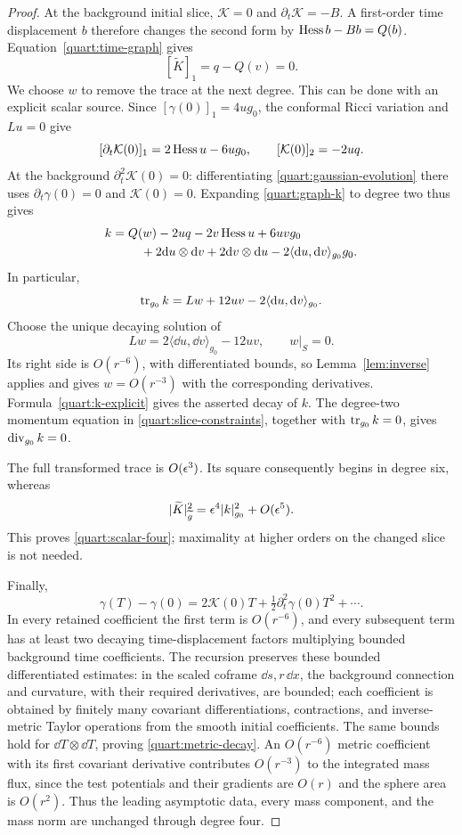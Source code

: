 \begin{proof}
At the background initial slice, \(\mathcal K=0\) and
\(\partial_t\mathcal K=-B\).  A first-order time displacement \(b\)
therefore changes the second form by
\(\operatorname{Hess} b-Bb=Q(b)\).  Equation~\eqref{quart:time-graph} gives
\[
 [\widetilde K]_1=q-Q(v)=0.
\]
We choose \(w\) to remove the trace at the next degree.  This can be
done with an explicit scalar source.  Since
\([\gamma(0)]_1=4ug_0\), the conformal Ricci variation and \(Lu=0\)
give
\[
 [\partial_t\mathcal K(0)]_1
   =2\operatorname{Hess} u-6ug_0,
 \qquad [\mathcal K(0)]_2=-2uq.
\]
At the background \(\partial_t^2\mathcal K(0)=0\): differentiating
\eqref{quart:gaussian-evolution} there uses
\(\partial_t\gamma(0)=0\) and \(\mathcal K(0)=0\).
Expanding \eqref{quart:graph-k} to degree two thus gives
\begin{align}
 k={}&Q(w)-2uq-2v\operatorname{Hess} u+6uvg_0\nonumber\\
     &\quad+2\mathrm{d} u\otimes\mathrm{d} v+2\mathrm{d} v\otimes\mathrm{d} u
          -2\langle\mathrm{d} u,\mathrm{d} v\rangle_{g_0}g_0.
 \label{quart:k-explicit}
\end{align}
In particular,
\[
 \operatorname{tr}_{g_0}k=Lw+12uv-2\langle\mathrm{d} u,\mathrm{d} v\rangle_{g_0}.
\]
Choose the unique decaying solution of
\begin{equation}
 Lw=2\langle\dd u,\dd v\rangle_{g_0}-12uv,
 \qquad w|_S=0.
 \label{quart:w-equation}
\end{equation}
Its right side is \(O(r^{-6})\), with differentiated bounds, so
Lemma~\ref{lem:inverse} applies and gives \(w=O(r^{-3})\) with the
corresponding derivatives.  Formula~\eqref{quart:k-explicit} gives the
asserted decay of \(k\).  The degree-two momentum equation in
\eqref{quart:slice-constraints}, together with \(\operatorname{tr}_{g_0}k=0\),
gives \(\operatorname{div}_{g_0}k=0\).

The full transformed trace is \(O(\epsilon^3)\).  Its square consequently
begins in degree six, whereas
\[
 |\widetilde K|_{\widetilde g}^2
    =\epsilon^4|k|_{g_0}^2+O(\epsilon^5).
\]
This proves \eqref{quart:scalar-four}; maximality at higher orders on
the changed slice is not needed.

Finally,
\[
 \gamma(T)-\gamma(0)
  =2\mathcal K(0)T+\tfrac12\partial_t^2\gamma(0)T^2+\cdots.
\]
In every retained coefficient the first term is \(O(r^{-6})\), and
every subsequent term has at least two decaying time-displacement
factors multiplying bounded background time coefficients.  The
recursion preserves these bounded differentiated estimates: in the
scaled coframe \(\dd s,r\,\dd x\), the background connection and
curvature, with their required derivatives, are bounded; each
coefficient is obtained by finitely many covariant differentiations,
contractions, and inverse-metric Taylor operations from the smooth
initial coefficients.  The
same bounds hold for \(\dd T\otimes\dd T\), proving
\eqref{quart:metric-decay}.  An \(O(r^{-6})\) metric coefficient with
its first covariant derivative contributes \(O(r^{-3})\) to the
integrated mass flux, since the test potentials and their gradients
are \(O(r)\) and the sphere area is \(O(r^2)\).  Thus the leading
asymptotic data, every mass component, and the mass norm are unchanged
through degree four.


\end{proof}
